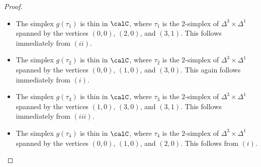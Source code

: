 \begin{proof}
\begin{itemize}
\begin{itemize}
of $\Delta^3 \times \Delta^1$ spanned by the vertices $(1,0)$, $(2,0)$, and $(3,0)$. This follows immediately from $(i)$.
\item The simplex $g(\tau_1)$ is thin in $\calC$, where $\tau_1$ is the $2$-simplex
of $\Delta^3 \times \Delta^1$ spanned by the vertices $(0,0)$, $(2,0)$, and $(3,1)$. This follows immediately from $(ii)$.
\item The simplex $g(\tau_2)$ is thin in $\calC$, where $\tau_2$ is the $2$-simplex of
$\Delta^3 \times \Delta^1$ spanned by the vertices $(0,0)$, $(1,0)$, and $(3,0)$. This again follows immediately from $(i)$.
\item The simplex $g(\tau_3)$ is thin in $\calC$, where $\tau_3$ is the $2$-simplex of
$\Delta^3 \times \Delta^1$ spanned by the vertices $(1,0)$, $(3,0)$, and $(3,1)$. This follows immediately from $(iii)$.
\item The simplex $g(\tau_4)$ is thin in $\calC$, where $\tau_4$ is the $2$-simplex of
$\Delta^3 \times \Delta^1$ spanned by the vertices $(0,0)$, $(1,0)$, and $(2,0)$. This follows from $(i)$.
\end{itemize}


\end{itemize}
\end{proof}
